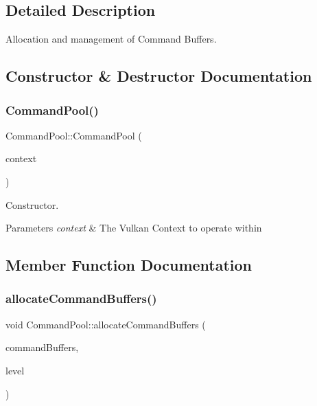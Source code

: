 \subsection{Detailed Description}
Allocation and management of Command Buffers. 

\subsection{Constructor \& Destructor Documentation}
\mbox{\label{class_command_pool_ace23b24c2f86842645c6c371edba8df5}} 
\subsubsection{\texorpdfstring{CommandPool()}{CommandPool()}}
{\footnotesize\ttfamily Command\+Pool\+::\+Command\+Pool (\begin{DoxyParamCaption}\item[{std\+::shared\+\_\+ptr$<$ \mbox{\hyperlink{class_vulkan_context}{Vulkan\+Context}} $>$}]{context }\end{DoxyParamCaption})}



Constructor. 


\begin{DoxyParams}{Parameters}
{\em context} & The Vulkan Context to operate within \\
\hline
\end{DoxyParams}


\subsection{Member Function Documentation}
\mbox{\label{class_command_pool_a333fb2b62823ad527f263bc0b8a72d4e}} 
\subsubsection{\texorpdfstring{allocateCommandBuffers()}{allocateCommandBuffers()}}
{\footnotesize\ttfamily void Command\+Pool\+::allocate\+Command\+Buffers (\begin{DoxyParamCaption}\item[{std\+::vector$<$ Vk\+Command\+Buffer $>$ \&}]{command\+Buffers,  }\item[{Vk\+Command\+Buffer\+Level}]{level }\end{DoxyParamCaption})}




